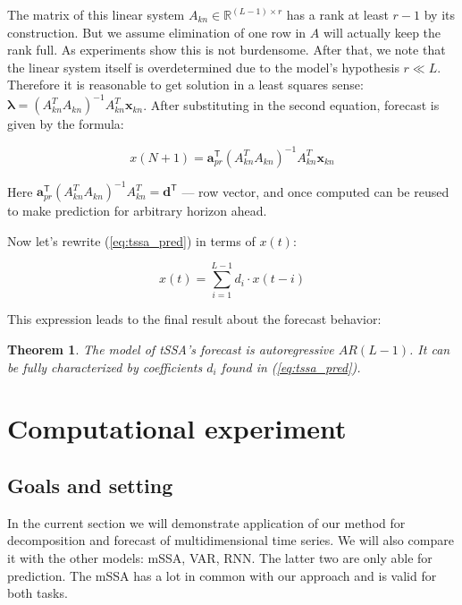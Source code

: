 \documentclass[referee, pdflatex, sn-mathphys-num]{sn-jnl}
\theoremstyle{definition}
\theoremstyle{plain}
\newtheorem{Th}{Theorem}
\begin{document}
	The matrix of this linear system $ A_{kn} \in \mathbb{R}^{(L - 1) \times r} $ has a rank at least $ r - 1 $ by its construction. But we assume elimination of one row in $ A $ will actually keep the rank full. As experiments show this is not burdensome. After that, we note that the linear system itself is overdetermined due to the model's hypothesis $ r \ll L $. Therefore it is reasonable to get solution in a least squares sense: $ \boldsymbol{\lambda} = (A_{kn}^T A_{kn})^{-1} A_{kn}^T \mathbf{x}_{kn} $. After substituting in the second equation, forecast is given by the formula:
	
	\begin{equation}\label{eq:tssa_pred}
		x(N + 1) = \mathbf{a}_{pr}^{\mathsf{T}} (A_{kn}^T A_{kn})^{-1} A_{kn}^T \mathbf{x}_{kn}
	\end{equation}
	
	Here $ \mathbf{a}_{pr}^{\mathsf{T}} (A_{kn}^T A_{kn})^{-1} A_{kn}^T = \mathbf{d}^{\mathsf{T}} $ --- row vector, and once computed can be reused to make prediction for arbitrary horizon ahead.
	
	Now let's rewrite (\ref{eq:tssa_pred}) in terms of $ x(t) $:
	
	\begin{equation*}\label{eq:autoregr}
		x(t) = \sum\limits_{i = 1}^{L - 1} d_i \cdot x(t - i)
	\end{equation*}
	
	This expression leads to the final result about the forecast behavior:
	
	\begin{Th}		
		The model of tSSA's forecast is \emph{autoregressive} $ AR(L - 1) $. It can be fully characterized by coefficients $ d_i $ found in (\ref{eq:tssa_pred}).
	\end{Th}
	
	\section{Computational experiment}	
	
	\subsection{Goals and setting}
	
	In the current section we will demonstrate application of our method for decomposition and forecast of multidimensional time series. We will also compare it with the other models: mSSA, VAR, RNN. The latter two are only able for prediction. The mSSA has a lot in common with our approach and is valid for both tasks.
	
\end{document}
